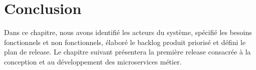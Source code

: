 \section*{Conclusion}
Dans ce chapitre, nous avons identifié les acteurs du système, spécifié les besoins fonctionnels et non fonctionnels, élaboré le backlog produit priorisé et défini le plan de release. Le chapitre suivant présentera la première release consacrée à la conception et au développement des microservices métier.

\newpage
